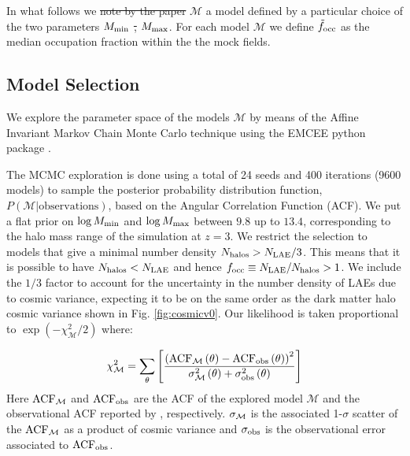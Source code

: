 \documentclass{emulateapj}
\newcommand{\mmax}{{\ifmmode{{M_{\rm max}}}\else{${M_{\rm max}}$}\fi}}
\newcommand{\focc}{{\ifmmode{{f_{\rm occ}}}\else{${f_{\rm occ}}$}\fi}}
\providecommand{\DIFadd}[1]{{\protect\color{blue}\uwave{#1}}} %
\providecommand{\DIFdel}[1]{{\protect\color{red}\sout{#1}}}                      %
\providecommand{\DIFaddbegin}{} %
\providecommand{\DIFaddend}{} %
\providecommand{\DIFdelbegin}{} %
\providecommand{\DIFdelend}{} %
\begin{document}
In what follows we \DIFdelbegin \DIFdel{note by the paper }\DIFdelend \DIFaddbegin \DIFadd{will describe by the letter }\DIFaddend ${\mathcal M}$  a model
defined by a particular choice of the two parameters $M_{\rm min}$ \DIFdelbegin \DIFdel{, 
}\DIFdelend \DIFaddbegin \DIFadd{and
}\DIFaddend $M_{\rm  max}$. For each model  ${\mathcal M}$ we define
$\tilde{f}_{\rm occ}$ as the median occupation fraction within the the
mock fields.

\subsection{Model Selection}
\label{subsec:explore}



We  explore the parameter space of the models
${\mathcal M}$ by  means of the Affine Invariant  Markov Chain Monte Carlo technique using
the EMCEE python package \citep[][and references therein]{emcee2013}. 


The MCMC exploration is done using a total of 24 seeds and 400
iterations (9600 models) to sample the posterior  probability distribution function, $P(\mathcal{M}|\mathrm{observations})$, based on the Angular
Correlation Function (ACF). We put a flat prior on $\log M_{\rm min}$ and $\log \mmax$ between
$9.8$ up to $13.4$, corresponding to the halo mass range of
the simulation at $z=3$.
We restrict the selection to models that give a minimal number density
$N_{\rm{halos}}>N_{\rm LAE}/3$.
This means that it is possible to have $N_{\rm{halos}} < N_{\rm LAE}$
and hence $\focc\equiv N_{\rm{LAE}}/N_{\rm{halos}}>1$.
We include the $1/3$ factor to account for the uncertainty in the number
density of LAEs due to cosmic variance, expecting it to be on the
same order as the dark matter halo cosmic variance shown in
Fig. \ref{fig:cosmicv0}.   Our likelihood is taken proportional to
$ \exp(-\chi_{\mathcal  M}^2/2)$  where:

\begin{equation}
\chi_{\mathcal M}^2=
\sum_{\theta}\left[\frac{\left( \rm{ACF}_{\mathcal
      M}\left(\theta\right) - \rm{ACF}_{\rm
      obs}\left(\theta\right)\right)^2}{ \sigma_{\rm \mathcal
      M}^{2}\left(\theta\right) + \sigma_{\rm
      obs}^{2}\left(\theta\right)}\right]
\end{equation}
%
Here  $\rm{ACF}_{\mathcal M}$ and  $\rm{ACF}_{\rm obs}$ are the ACF
of the explored model ${\mathcal M}$ and the observational ACF
reported by \citet{Bielby16}, respectively.
$\sigma_{\rm \mathcal M}$ is the associated 1-$\sigma$ scatter  of the
$\rm{ACF}_{\mathcal M}$ as a product of cosmic variance and
$\sigma_{\rm obs}$ is the observational error associated to
$\rm{ACF}_{\rm obs}$.
\end{document}
